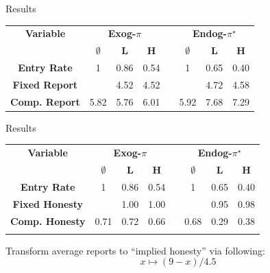 \documentclass{beamer}
\begin{document}
\begin{frame}{Results}
    \begin{center}
        \begin{tabular}{cccccccc}
        \toprule \textbf{Variable} & \multicolumn{3}{c}{\textbf{Exog-$\pi$}} &  & \multicolumn{3}{c}{\textbf{Endog-$\pi^{\star}$}}\\ 
        \cmidrule{2-4}\cmidrule{6-8} & \textbf{$\emptyset$} & \textbf{L} & \textbf{H} &  & \textbf{$\emptyset$} & \textbf{L} & \textbf{H}\\ 
        \midrule \textbf{Entry Rate} & 1 & 0.86 & 0.54 &  & 1 & 0.65 & 0.40\\ 
        \textbf{Fixed Report} & \textendash{} & 4.52 & 4.52 &  & \textendash{} & 4.72 & 4.58\\ 
        \textbf{Comp. Report} & 5.82 & 5.76 & 6.01 &  & 5.92 & 7.68 & 7.29\\ 
        \bottomrule
        \end{tabular}
    \end{center}
\end{frame}

\begin{frame}{Results}
    \begin{center}
        \begin{tabular}{cccccccc}
        \toprule \textbf{Variable} & \multicolumn{3}{c}{\textbf{Exog-$\pi$}} &  & \multicolumn{3}{c}{\textbf{Endog-$\pi^{\star}$}}\\ 
        \cmidrule{2-4}\cmidrule{6-8} & \textbf{$\emptyset$} & \textbf{L} & \textbf{H} &  & \textbf{$\emptyset$} & \textbf{L} & \textbf{H}\\ 
        \midrule \textbf{Entry Rate} & 1 & 0.86 & 0.54 &  & 1 & 0.65 & 0.40\\ 
        \textbf{Fixed Honesty} & \textendash{} & 1.00 & 1.00 &  & \textendash{} & 0.95 & 0.98\\ 
        \textbf{Comp. Honesty} & 0.71 & 0.72 & 0.66 &  & 0.68 & 0.29 & 0.38\\ 
        \bottomrule  &  &  &  &  &  &  & \\ 
        \end{tabular}
    \end{center}

Transform average reports to ``implied honesty'' via following:
\[
x\mapsto(9-x)/4.5
\]
\end{frame}
\end{document}
